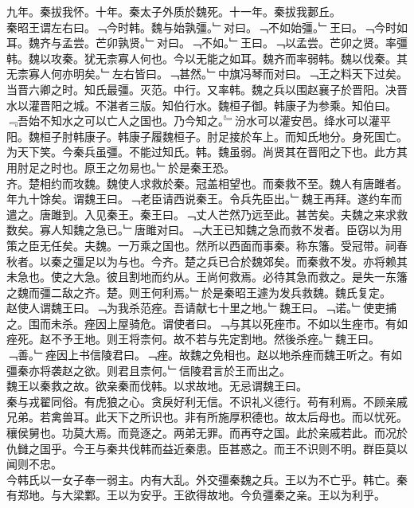 \documentclass{zhvt-classic}
\begin{document}
\hspace*{2em}九年。秦拔我怀。十年。秦太子外质於魏死。十一年。秦拔我郪丘。\\
\hspace*{2em}秦昭王谓左右曰。﹁今时韩。魏与始孰彊。﹂对曰。﹁不如始彊。﹂王曰。﹁今时如耳。魏齐与孟尝。芒卯孰贤。﹂对曰。﹁不如。﹂王曰。﹁以孟尝。芒卯之贤。率彊韩。魏以攻秦。犹无柰寡人何也。今以无能之如耳。魏齐而率弱韩。魏以伐秦。其无柰寡人何亦明矣。﹂左右皆曰。﹁甚然。﹂中旗冯琴而对曰。﹁王之料天下过矣。当晋六卿之时。知氏最彊。灭范。中行。又率韩。魏之兵以围赵襄子於晋阳。决晋水以灌晋阳之城。不湛者三版。知伯行水。魏桓子御。韩康子为参乘。知伯曰。﹃吾始不知水之可以亡人之国也。乃今知之。﹄汾水可以灌安邑。绛水可以灌平阳。魏桓子肘韩康子。韩康子履魏桓子。肘足接於车上。而知氏地分。身死国亡。为天下笑。今秦兵虽彊。不能过知氏。韩。魏虽弱。尚贤其在晋阳之下也。此方其用肘足之时也。原王之勿易也。﹂於是秦王恐。\\
\hspace*{2em}齐。楚相约而攻魏。魏使人求救於秦。冠盖相望也。而秦救不至。魏人有唐雎者。年九十馀矣。谓魏王曰。﹁老臣请西说秦王。令兵先臣出。﹂魏王再拜。遂约车而遣之。唐雎到。入见秦王。秦王曰。﹁丈人芒然乃远至此。甚苦矣。夫魏之来求救数矣。寡人知魏之急已。﹂唐雎对曰。﹁大王已知魏之急而救不发者。臣窃以为用策之臣无任矣。夫魏。一万乘之国也。然所以西面而事秦。称东籓。受冠带。祠春秋者。以秦之彊足以为与也。今齐。楚之兵已合於魏郊矣。而秦救不发。亦将赖其未急也。使之大急。彼且割地而约从。王尚何救焉。必待其急而救之。是失一东籓之魏而彊二敌之齐。楚。则王何利焉。﹂於是秦昭王遽为发兵救魏。魏氏复定。\\
\hspace*{2em}赵使人谓魏王曰。﹁为我杀范痤。吾请献七十里之地。﹂魏王曰。﹁诺。﹂使吏捕之。围而未杀。痤因上屋骑危。谓使者曰。﹁与其以死痤市。不如以生痤市。有如痤死。赵不予王地。则王将柰何。故不若与先定割地。然後杀痤。﹂魏王曰。﹁善。﹂痤因上书信陵君曰。﹁痤。故魏之免相也。赵以地杀痤而魏王听之。有如彊秦亦将袭赵之欲。则君且柰何。﹂信陵君言於王而出之。\\
\hspace*{2em}魏王以秦救之故。欲亲秦而伐韩。以求故地。无忌谓魏王曰。\\
\hspace*{2em}秦与戎翟同俗。有虎狼之心。贪戾好利无信。不识礼义德行。苟有利焉。不顾亲戚兄弟。若禽兽耳。此天下之所识也。非有所施厚积德也。故太后母也。而以忧死。穰侯舅也。功莫大焉。而竟逐之。两弟无罪。而再夺之国。此於亲戚若此。而况於仇雠之国乎。今王与秦共伐韩而益近秦患。臣甚惑之。而王不识则不明。群臣莫以闻则不忠。\\
\hspace*{2em}今韩氏以一女子奉一弱主。内有大乱。外交彊秦魏之兵。王以为不亡乎。韩亡。秦有郑地。与大梁鄴。王以为安乎。王欲得故地。今负彊秦之亲。王以为利乎。\\
\end{document}
